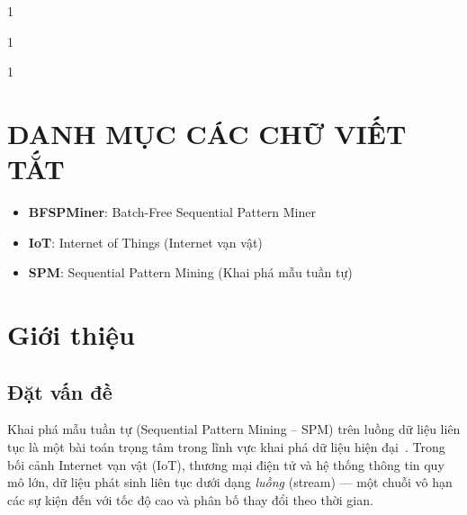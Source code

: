 \documentclass[14pt,a4paper,oneside]{extreport}
\begin{document}
\renewcommand{\contentsname}{MỤC LỤC}
\cleardoublepage
{}
\begin{spacing}{1}
\tableofcontents
\end{spacing}
\newpage

\renewcommand{\listfigurename}{DANH MỤC HÌNH VẼ}
\cleardoublepage
{}
\begin{spacing}{1}
\listoffigures
\end{spacing}
\newpage

\renewcommand{\listtablename}{DANH MỤC BẢNG BIỂU}
\cleardoublepage
{}
\begin{spacing}{1}
\listoftables
\end{spacing}
\newpage

\chapter*{DANH MỤC CÁC CHỮ VIẾT TẮT}
\begin{itemize}
    \item \textbf{BFSPMiner}: Batch-Free Sequential Pattern Miner
    \item \textbf{IoT}: Internet of Things (Internet vạn vật)
    \item \textbf{SPM}: Sequential Pattern Mining (Khai phá mẫu tuần tự)
\end{itemize}
\newpage

\clearpage
{}
\setcounter{page}{1} %
\chapter{Giới thiệu}
\label{chap:intro}

\section{Đặt vấn đề}
Khai phá mẫu tuần tự (Sequential Pattern Mining -- SPM) trên luồng dữ liệu liên tục là một bài toán trọng tâm trong lĩnh vực khai phá dữ liệu hiện đại~\cite{fournier2017}. Trong bối cảnh Internet vạn vật (IoT), thương mại điện tử và hệ thống thông tin quy mô lớn, dữ liệu phát sinh liên tục dưới dạng \textit{luồng} (stream) --- một chuỗi vô hạn các sự kiện đến với tốc độ cao và phân bố thay đổi theo thời gian.
\end{document}
